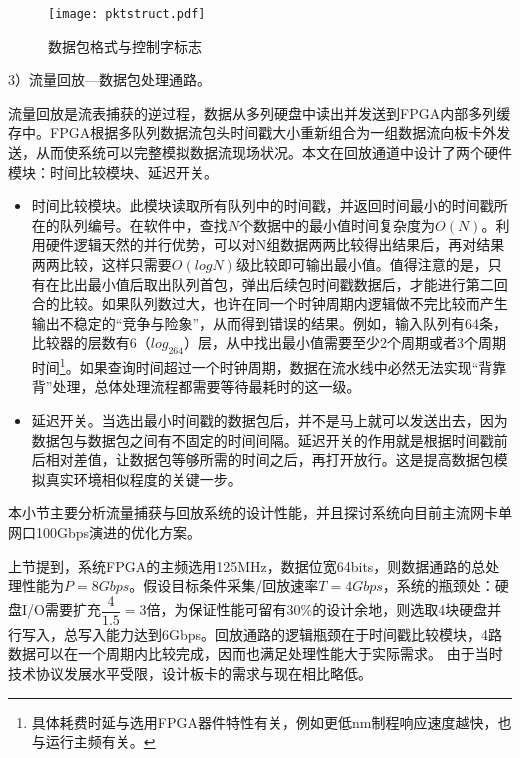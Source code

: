 \begin{figure}[!ht]
	\centering 
	\vspace{-1.5mm}
	\texttt{[image: pktstruct.pdf]}
	\caption{数据包格式与控制字标志} \label{fig:pktstruct}
\end{figure}

3）流量回放---数据包处理通路。

流量回放是流表捕获的逆过程，数据从多列硬盘中读出并发送到FPGA内部多列缓存中。FPGA根据多队列数据流包头时间戳大小重新组合为一组数据流向板卡外发送，从而使系统可以完整模拟数据流现场状况。本文在回放通道中设计了两个硬件模块：时间比较模块、延迟开关。

\begin{itemize}
	\item 时间比较模块。此模块读取所有队列中的时间戳，并返回时间最小的时间戳所在的队列编号。在软件中，查找$N$个数据中的最小值时间复杂度为$ O(N) $。利用硬件逻辑天然的并行优势，可以对N组数据两两比较得出结果后，再对结果两两比较，这样只需要$ O(log N) $级比较即可输出最小值。值得注意的是，只有在比出最小值后取出队列首包，弹出后续包时间戳数据后，才能进行第二回合的比较。如果队列数过大，也许在同一个时钟周期内逻辑做不完比较而产生输出不稳定的“竞争与险象”，从而得到错误的结果。例如，输入队列有64条，比较器的层数有6（$ log_264 $）层，从中找出最小值需要至少2个周期或者3个周期时间\footnote{具体耗费时延与选用FPGA器件特性有关，例如更低nm制程响应速度越快，也与运行主频有关。}。如果查询时间超过一个时钟周期，数据在流水线中必然无法实现“背靠背”处理，总体处理流程都需要等待最耗时的这一级。
	\item 延迟开关。当选出最小时间戳的数据包后，并不是马上就可以发送出去，因为数据包与数据包之间有不固定的时间间隔。延迟开关的作用就是根据时间戳前后相对差值，让数据包等够所需的时间之后，再打开放行。这是提高数据包模拟真实环境相似程度的关键一步。
\end{itemize}

\label{chap345}

本小节主要分析流量捕获与回放系统的设计性能，并且探讨系统向目前主流网卡单网口100Gbps演进的优化方案。

上节提到，系统FPGA的主频选用125MHz，数据位宽64bits，则数据通路的总处理性能为$ P=8Gbps $。假设目标条件采集/回放速率$ T=4Gbps $，系统的瓶颈处：硬盘I/O需要扩充$ \dfrac{4}{1.5}=3 $倍，为保证性能可留有30\%的设计余地，则选取4块硬盘并行写入，总写入能力达到6Gbps。回放通路的逻辑瓶颈在于时间戳比较模块，4路数据可以在一个周期内比较完成，因而也满足处理性能大于实际需求。
由于当时技术协议发展水平受限，设计板卡的需求与现在相比略低。

